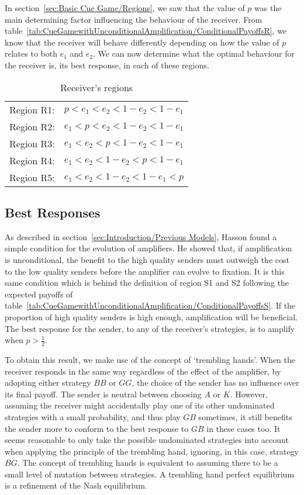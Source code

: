 \documentclass[a4paper,12pt]{article}
\numberwithin{equation}{section}
\begin{document}
In section~\ref{sec:Basic Cue Game/Regions}, we saw that the value of $p$ was the main determining factor influencing the behaviour of the receiver. From table~\ref{tab:CueGamewithUnconditionalAmplification/ConditionalPayoffsR}, we know that the receiver will behave differently depending on how the value of $p$ relates to both $e_{1}$ and $e_{2}$. We can now determine what the optimal behaviour for the receiver is, its best response, in each of these regions.

\begin{table}[h]
\begin{center}
\begin{tabular}{lc}
Region R1: & $p<e_{1}<e_{2}<1-e_{2}<1-e_{1}$\\
Region R2: & $e_{1}<p<e_{2}<1-e_{2}<1-e_{1}$\\
Region R3: & $e_{1}<e_{2}<p<1-e_{2}<1-e_{1}$\\
Region R4: & $e_{1}<e_{2}<1-e_{2}<p<1-e_{1}$\\
Region R5: & $e_{1}<e_{2}<1-e_{2}<1-e_{1}<p$
\end{tabular}
\end{center}
\caption{Receiver's regions}
\label{tab:CueGamewithUnconditionalAmplification/RegionsR}
\end{table}


\subsection{Best Responses}
\label{sec:Cue Game with Unconditional Amplification/Best Response}

As described in section~\ref{sec:Introduction/Previous Models}, Hasson found a simple condition for the evolution of amplifiers. He showed that, if amplification is unconditional, the benefit to the high quality senders must outweigh the cost to the low quality senders before the amplifier can evolve to fixation. It is this same condition which is behind the definition of region S1 and S2 following the expected payoffs of table~\ref{tab:CueGamewithUnconditionalAmplification/ConditionalPayoffsS}. If the proportion of high quality senders is high enough, amplification will be beneficial. The best response for the sender, to any of the receiver's strategies, is to amplify when $p>\frac{1}{2}$.

To obtain this result, we make use of the concept of `trembling hands'. When the receiver responds in the same way regardless of the effect of the amplifier, by adopting either strategy $BB$ or $GG$, the choice of the sender has no influence over its final payoff. The sender is neutral between choosing $A$ or $K$. However, assuming the receiver might accidentally play one of its other undominated strategies with a small probability, and thus play $GB$ sometimes, it still benefits the sender more to conform to the best response to $GB$ in these cases too. It seems reasonable to only take the possible undominated strategies into account when applying the principle of the trembling hand, ignoring, in this case, strategy $BG$. The concept of trembling hands is equivalent to assuming there to be a small level of mutation between strategies. A trembling hand perfect equilibrium is a refinement of the Nash equilibrium.
\end{document}
